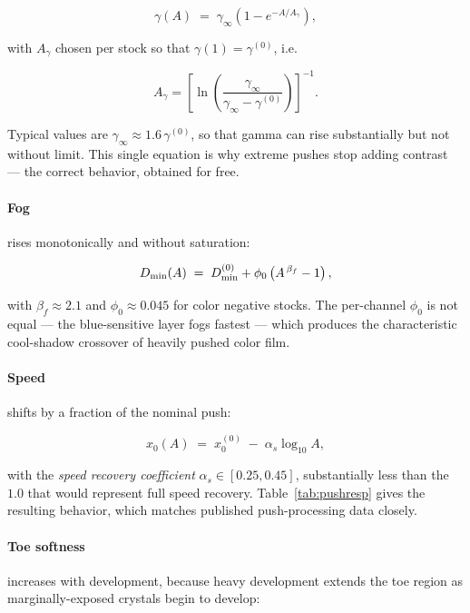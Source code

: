 \begin{equation}
\gamma(A) \;=\; \gamma_\infty\left(1 - e^{-A/A_\gamma}\right),
\label{eq:gammatime}
\end{equation}

with $A_\gamma$ chosen per stock so that $\gamma(1) = \gamma^{(0)}$, i.e.

\begin{equation}
A_\gamma = \left[\ln\!\left(\frac{\gamma_\infty}{\gamma_\infty - \gamma^{(0)}}\right)\right]^{-1}.
\end{equation}

Typical values are $\gamma_\infty \approx 1.6\,\gamma^{(0)}$, so that gamma can
rise substantially but not without limit. This single equation is why extreme
pushes stop adding contrast --- the correct behavior, obtained for free.

\paragraph{Fog} rises monotonically and without saturation:

\begin{equation}
D_{\min}(A) \;=\; D_{\min}^{(0)} + \phi_0\left(A^{\,\beta_f} - 1\right),
\label{eq:fog}
\end{equation}

with $\beta_f \approx 2.1$ and $\phi_0 \approx 0.045$ for color negative
stocks. The per-channel $\phi_0$ is not equal --- the blue-sensitive layer fogs
fastest --- which produces the characteristic cool-shadow crossover of
heavily pushed color film.

\paragraph{Speed} shifts by a fraction of the nominal push:

\begin{equation}
x_0(A) \;=\; x_0^{(0)} \;-\; \alpha_s \log_{10} A,
\label{eq:speedshift}
\end{equation}

with the \emph{speed recovery coefficient} $\alpha_s \in [0.25, 0.45]$,
substantially less than the $1.0$ that would represent full speed recovery.
Table~\ref{tab:pushresp} gives the resulting behavior, which matches published
push-processing data closely.

\paragraph{Toe softness} increases with development, because heavy development
extends the toe region as marginally-exposed crystals begin to develop:

